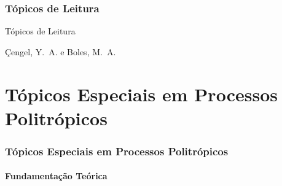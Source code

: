 \section{Tópicos de Leitura}

    \begin{frame}[allowframebreaks]{Tópicos de Leitura}
        \begin{thebibliography}{Çengel, Y.~A., 2013}
                Çengel, Y.~A. e Boles, M.~A.
        \end{thebibliography}
    \end{frame}


\part{Tópicos Especiais em Processos Politrópicos}

\section{Tópicos Especiais em Processos Politrópicos}

\subsection{Fundamentação Teórica}


